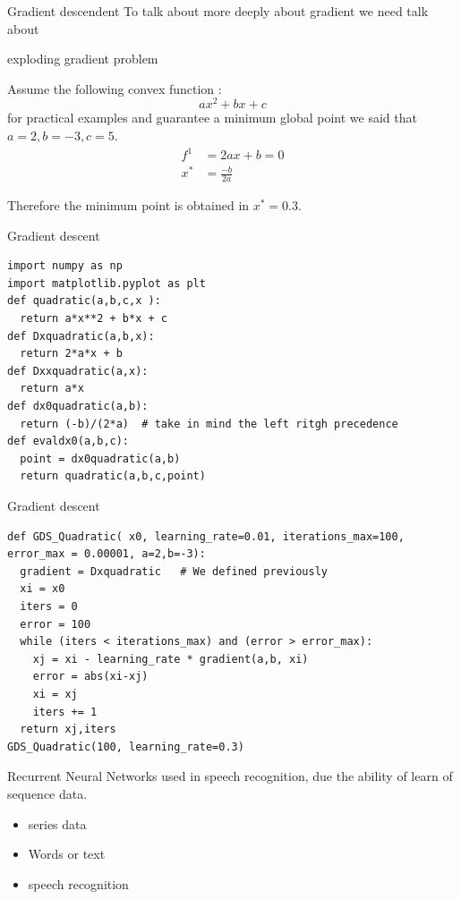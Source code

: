 \documentclass{beamer}
\begin{document}
\begin{frame}{Gradient descendent}
To talk about more deeply about gradient we need talk about 

exploding gradient problem


Assume the following convex function :
\begin{equation}
ax^{2}+ bx+c 
\end{equation}
for practical examples and guarantee a minimum global point we said that $a=2,b=-3, c=5$.
\begin{equation}
\begin{align*}
f^{1} &= 2ax + b = 0 \\
x^{*} &= \frac{-b}{2a} 
\end{align*}
\end{equation}

Therefore the minimum point is obtained in $x^{*} = 0.3$.



\end{frame}

\begin{frame}[fragile]{Gradient descent}
\begin{lstlisting}
import numpy as np
import matplotlib.pyplot as plt
def quadratic(a,b,c,x ):
  return a*x**2 + b*x + c
def Dxquadratic(a,b,x):
  return 2*a*x + b
def Dxxquadratic(a,x):
  return a*x
def dx0quadratic(a,b):
  return (-b)/(2*a)  # take in mind the left ritgh precedence 
def evaldx0(a,b,c):
  point = dx0quadratic(a,b)
  return quadratic(a,b,c,point)
\end{lstlisting}
\end{frame}






\begin{frame}[fragile]{Gradient descent}
\begin{lstlisting}
def GDS_Quadratic( x0, learning_rate=0.01, iterations_max=100, error_max = 0.00001, a=2,b=-3):
  gradient = Dxquadratic   # We defined previously
  xi = x0
  iters = 0
  error = 100
  while (iters < iterations_max) and (error > error_max):
    xj = xi - learning_rate * gradient(a,b, xi)
    error = abs(xi-xj)
    xi = xj
    iters += 1
  return xj,iters
GDS_Quadratic(100, learning_rate=0.3) 
\end{lstlisting}
\end{frame}


\begin{frame}{Recurrent Neural Networks}
used in speech recognition, due the ability of learn of sequence data. 
\begin{itemize}
\item series data
\item Words or text
\item speech recognition
\end{itemize}
\end{frame}
\end{document}
